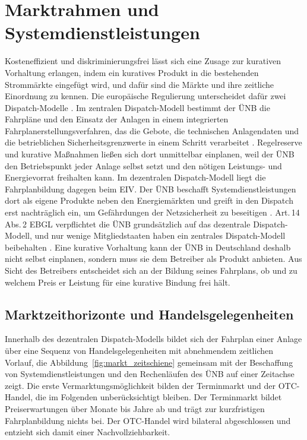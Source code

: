 \section{Marktrahmen und Systemdienstleistungen}
\label{sec:market_framework}
Kosteneffizient und diskriminierungsfrei lässt sich eine Zusage zur kurativen Vorhaltung erlangen, indem ein kuratives Produkt in die bestehenden Strommärkte eingefügt wird, und dafür sind die Märkte und ihre zeitliche Einordnung zu kennen.
Die europäische Regulierung unterscheidet dafür zwei Dispatch-Modelle \cite{europaisches_parlament_und_rat_der_eu_verordnung_2019}.
Im zentralen Dispatch-Modell bestimmt der \ac{ÜNB} die Fahrpläne und den Einsatz der Anlagen in einem integrierten Fahrplanerstellungsverfahren, das die Gebote, die technischen Anlagendaten und die betrieblichen Sicherheitsgrenzwerte in einem Schritt verarbeitet \cite{europaische_kommission_verordnung_2017_ebgl}.
Regelreserve und kurative Maßnahmen ließen sich dort unmittelbar einplanen, weil der \ac{ÜNB} den Betriebspunkt jeder Anlage selbst setzt und den nötigen Leistungs- und Energievorrat freihalten kann.
Im dezentralen Dispatch-Modell liegt die Fahrplanbildung dagegen beim \ac{EIV}.
Der \ac{ÜNB} beschafft Systemdienstleistungen dort als eigene Produkte neben den Energiemärkten und greift in den Dispatch erst nachträglich ein, um Gefährdungen der Netzsicherheit zu beseitigen \cite{bundesministerium_der_justiz_energiewirtschaftsgesetz_2025}.
Art.\,14 Abs.\,2 \ac{EBGL} verpflichtet die \ac{ÜNB} grundsätzlich auf das dezentrale Dispatch-Modell, und nur wenige Mitgliedstaaten haben ein zentrales Dispatch-Modell beibehalten \cite{meeus_evolution_2020}.
Eine kurative Vorhaltung kann der \ac{ÜNB} in Deutschland deshalb nicht selbst einplanen, sondern muss sie dem Betreiber als Produkt anbieten.
Aus Sicht des Betreibers entscheidet sich an der Bildung seines Fahrplans, ob und zu welchem Preis er Leistung für eine kurative Bindung frei hält.

\subsection{Marktzeithorizonte und Handelsgelegenheiten}
\label{sec:market_horizons}
Innerhalb des dezentralen Dispatch-Modells bildet sich der Fahrplan einer Anlage über eine Sequenz von Handelsgelegenheiten mit abnehmendem zeitlichen Vorlauf, die Abbildung~\ref{fig:markt_zeitschiene} gemeinsam mit der Beschaffung von Systemdienstleistungen und den Rechenläufen des \ac{ÜNB} auf einer Zeitachse zeigt.
Die erste Vermarktungsmöglichkeit bilden der Terminmarkt und der \ac{OTC}-Handel, die im Folgenden unberücksichtigt bleiben.
Der Terminmarkt bildet Preiserwartungen über Monate bis Jahre ab und trägt zur kurzfristigen Fahrplanbildung nichts bei.
Der \ac{OTC}-Handel wird bilateral abgeschlossen und entzieht sich damit einer Nachvollziehbarkeit.


